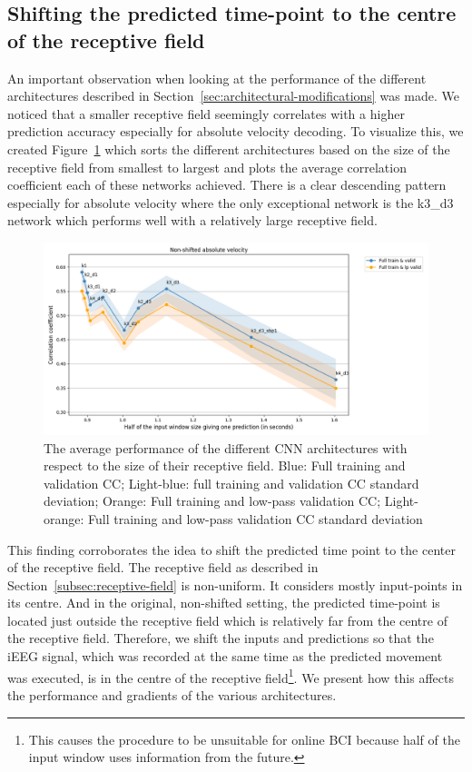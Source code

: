 \subsection{Shifting the predicted time-point to the centre of the receptive field}\label{subsec:shifting-the-predicted-time-point-to-the-centre-of-the-receptive-field}
An important observation when looking at the performance of the different architectures described in Section~\ref{sec:architectural-modifications} was made.
We noticed that a smaller receptive field seemingly correlates with a higher prediction accuracy especially for absolute velocity decoding.
To visualize this, we created Figure~\ref{fig:figure-distance} which sorts the different architectures based on the size of the receptive field from smallest to largest and plots the average correlation coefficient each of these networks achieved.
There is a clear descending pattern especially for absolute velocity where the only exceptional network is the k3\_d3 network which performs well with a relatively large receptive field.


\begin{figure}[!htbp]
\centering
   \includegraphics[width=1\linewidth]{img/ch4/distance-shifted-performance-absVel}
   \caption[Dependence of performance on receptive field size]{The average performance of the different CNN architectures with respect to the size of their receptive field. Blue: Full training and validation CC; Light-blue: full training and validation CC standard deviation; Orange: Full training and low-pass validation CC; Light-orange: Full training and low-pass validation CC standard deviation}
   \label{fig:figure-distance}
\end{figure}

This finding corroborates the idea to shift the predicted time point to the center of the receptive field.
The receptive field as described in Section~\ref{subsec:receptive-field} is non-uniform.
It considers mostly input-points in its centre.
And in the original, non-shifted setting, the predicted time-point is located just outside the receptive field which is relatively far from the centre of the receptive field.
Therefore, we shift the inputs and predictions so that the iEEG signal, which was recorded at the same time as the predicted movement was executed, is in the centre of the receptive field\footnote{This causes the procedure to be unsuitable for online BCI because half of the input window uses information from the future.}. 
We present how this affects the performance and gradients of the various architectures.

